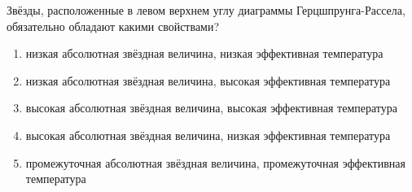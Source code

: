 Звёзды, расположенные в левом верхнем углу диаграммы
Герцшпрунга-Рассела, обязательно обладают какими свойствами?

\begin{enumerate}[label=\alph*)]
  \item низкая абсолютная звёздная величина, низкая эффективная
температура
  \item низкая абсолютная звёздная величина, высокая эффективная
температура
  \item высокая абсолютная звёздная величина, высокая эффективная
температура
  \item высокая абсолютная звёздная величина, низкая эффективная
температура
  \item промежуточная абсолютная звёздная величина, промежуточная
эффективная температура
\end{enumerate}
